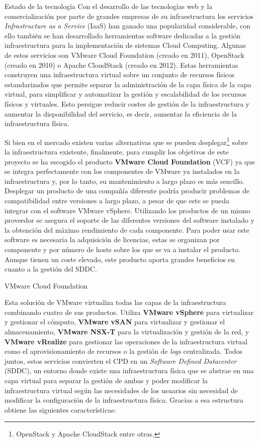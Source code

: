\begin{section}{Estado de la tecnología}
Con el desarrollo de las tecnologías web y la comercialización por parte de grandes empresas de su infraestructura los servicios \textit{Infrastructure as a Service} (IaaS) han ganado una popularidad considerable, con ello también se han desarrollado herramientas software dedicadas a la gestión infraestructura para la implementación de sistemas Cloud Computing. Algunas de estos servicios son VMware Cloud Foundation (creado en 2011), OpenStack (creado en 2010) o Apache CloudStack (creado en 2012). Estas herramientas construyen una infraestructura virtual sobre un conjunto de recursos físicos estandarizados que permite separar la administración de la capa física de la capa virtual, para simplificar y automatizar la gestión y escalabilidad de los recursos físicos y virtuales. Esto persigue reducir costes de gestión de la infraestructura y aumentar la disponibilidad del servicio, es decir, aumentar la eficiencia de la infraestructura física.

Si bien en el mercado existen varias alternativas que se pueden desplegar\footnote{OpenStack y Apache CloudStack entre otras.} sobre la infraestructura existente, finalmente, para cumplir los objetivos de este proyecto se ha escogido el producto \textbf{VMware Cloud Foundation} (VCF) ya que se integra perfectamente con los componentes de VMware ya instalados en la infraestructura y, por lo tanto, su mantenimiento a largo plazo es más sencillo. Desplegar un producto de una compañía diferente podría producir problemas de compatibilidad entre versiones a largo plazo, a pesar de que este se pueda integrar con el software VMware vSphere. Utilizando los productos de un mismo proveedor se asegura el soporte de las diferentes versiones del software instalado y la obtención del máximo rendimiento de cada componente.
Para poder usar este software es necesaria la adquisición de licencias, estas se organizan por componente y por número de hosts sobre los que se va a instalar el producto. Aunque tienen un coste elevado, este producto aporta grandes beneficios en cuanto a la gestión del SDDC.
\begin{subsection}{VMware Cloud Foundation}

    Esta solución de VMware virtualiza todas las capas de la infraestructura combinando cuatro de sus productos. Utiliza \textbf{VMware vSphere} para virtualizar y gestionar el cómputo, \textbf{VMware vSAN} para virtualizar y gestionar el almacenamiento, \textbf{VMware NSX-T} para la virtualización y gestión de la red, y \textbf{VMware vRealize} para gestionar las operaciones de la infraestructura virtual como el aprovisionamiento de recursos o la gestión de \textit{logs} centralizada. Todos juntos, estos servicios convierten el CPD en un \textit{Software Defined Datacenter} (SDDC), un entorno donde existe una infraestructura física que se abstrae en una capa virtual para separar la gestión de ambas y poder modificar la infraestructura virtual según las necesidades de los usuarios sin necesidad de modificar la configuración de la infraestructura física. Gracias a esa estructura obtiene las siguientes características:
\begin{itemize}


\end{itemize}
\end{subsection}
\end{section}
